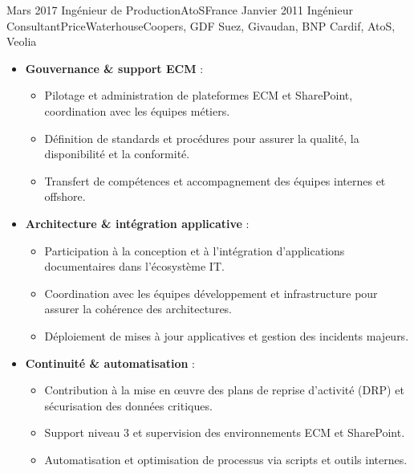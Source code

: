 \begin{experiences}
\emptySeparator

\consultantexperience
    {Mars 2017}       {Ingénieur de Production}{AtoS}{France}
    {Janvier 2011}    {Ingénieur Consultant}{PriceWaterhouseCoopers, GDF Suez, Givaudan, BNP Cardif, AtoS, Veolia} {
        \begin{itemize}[left=0pt,label={},itemsep=0.4em]

          \item \textbf{Gouvernance \& support ECM} :
            \begin{itemize}[itemsep=0.2em,topsep=0.2em,parsep=0pt]
              \small
              \item Pilotage et administration de plateformes ECM et SharePoint, coordination avec les équipes métiers.
              \item Définition de standards et procédures pour assurer la qualité, la disponibilité et la conformité.
              \item Transfert de compétences et accompagnement des équipes internes et offshore.
            \end{itemize}

          \item \textbf{Architecture \& intégration applicative} :
            \begin{itemize}[itemsep=0.2em,topsep=0.2em,parsep=0pt]
              \small
              \item Participation à la conception et à l’intégration d’applications documentaires dans l’écosystème IT.
              \item Coordination avec les équipes développement et infrastructure pour assurer la cohérence des architectures.
              \item Déploiement de mises à jour applicatives et gestion des incidents majeurs.
            \end{itemize}

          \item \textbf{Continuité \& automatisation} :
            \begin{itemize}[itemsep=0.2em,topsep=0.2em,parsep=0pt]
              \small
              \item Contribution à la mise en œuvre des plans de reprise d’activité (DRP) et sécurisation des données critiques.
              \item Support niveau 3 et supervision des environnements ECM et SharePoint.
              \item Automatisation et optimisation de processus via scripts et outils internes.
            \end{itemize}


\end{itemize}}
\end{experiences}
